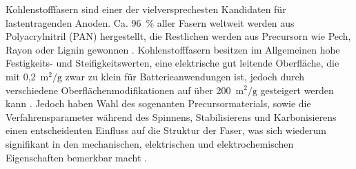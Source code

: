 Kohlenstofffasern sind einer der vielversprechesten Kandidaten für lastentragenden Anoden. Ca. 96~\% aller Fasern weltweit werden aus Polyacrylnitril (PAN) hergestellt, die Restlichen werden aus Precursorn wie Pech, Rayon oder Lignin gewonnen \cite{Das2016}. Kohlenstofffasern besitzen im Allgemeinen hohe Festigkeits- und Steifigkeitswerten, eine elektrische gut leitende Oberfläche, die mit 0,2~$\si{\metre \squared \per \g}$ zwar zu klein für Batterieanwendungen ist, jedoch durch verschiedene Oberflächenmodifikationen \cite{Qian2013,Senokos2023} auf über 200~$\si{\metre \squared \per \g}$ gesteigert werden kann \cite{Zenkert2024}. Jedoch haben Wahl des sogenanten Precursormaterials, sowie die Verfahrensparameter während des Spinnens, Stabilisierens und Karbonisierens einen entscheidenten Einfluss auf die Struktur der Faser, was sich wiederum signifikant in den mechanischen, elektrischen und elektrochemischen Eigenschaften bemerkbar macht \cite{Newcomb2015}.
